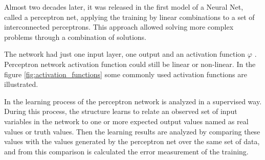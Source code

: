             \begin{figure}[ht]
            \end{figure}
            
            Almost two decades later, it was released in \cite{rede1} the first model of a Neural Net, called a perceptron net, applying the training by linear combinations to a set of interconnected perceptrons. This approach allowed solving more complex problems through a combination of solutions. 
              
            The network had just one input layer, one output and an activation function  $ \varphi $ \cite{Haykin1994}. Perceptron network activation function could still be linear or non-linear. In the figure \ref{fig:activation_functions} some commonly used activation functions are illustrated. 
            
             \begin{figure}[ht]
            \end{figure}
            
            In  the learning process of the perceptron network is analyzed in a supervised way. During this process, the structure learns to relate an observed set of input variables in the network to one or more expected output values named as real values or truth values. Then the learning results are analyzed by comparing these values with the values generated by the perceptron net over the same set of data, and from this comparison is calculated the error measurement of the training.
                        
